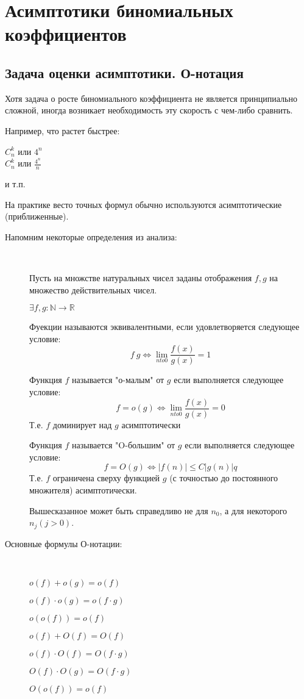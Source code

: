 \section{Асимптотики биномиальных коэффициентов}

\subsection{Задача оценки асимптотики. О-нотация}

Хотя задача о росте биномиального коэффициента не является 
принципиально сложной, иногда возникает необходимость эту скорость
с чем-либо сравнить.

Например, что растет быстрее:

$C_n^k$ или  $4^n $ \\

$ C_n^k $ или $ \frac{4^n}{n} $

и т.п.

На практике весто точных формул обычно используются асимптотические (приближенные).

\begin{description}
\item[Напомним некоторые определения из анализа:] ~

Пусть на множстве натуральных чисел заданы отображения $ f, g $ на множество действительных чисел.

$ \exists f, g \colon \mathbb{N} \to \mathbb{R} $ 

Фуекции называются эквивалентными, если удовлетворяется следующее условие:
$$
f ~ g \Leftrightarrow \lim_{n to 0} \frac{f(x)}{g(x)} = 1 
$$

Функция $ f $ называется "о-малым" от $ g $ если выполняется следующее условие:
$$
f = o(g) \Leftrightarrow \lim_{n to 0} \frac{f(x)}{g(x)} = 0
$$
Т.е. $ f $ доминирует над $ g $ асимптотически

Функция $ f $ называется "O-большим" от $ g $ если выполняется следующее условие:
$$
f = O(g) \Leftrightarrow |f(n)| \le C|g(n)|q 
$$
Т.е. $ f $ ограничена сверху функцией $ g $ (с точностью до постоянного множителя) асимптотически.

Вышесказанное может быть справедливо не для $ n_0 $, а для некоторого $ n_j (j > 0) $.

\end{description}

\begin{description}
\item[Основные формулы О-нотации:] ~

$o(f)+o(g) = o(f)$

$o(f) \cdot o(g) = o(f \cdot g)$

$o(o(f)) = o(f)$

$o(f)+O(f) = O(f)$

$o(f) \cdot O(f) = O(f \cdot g)$

$O(f) \cdot O(g) = O(f \cdot g)$

$O(o(f)) = o(f)$
\end{description}

